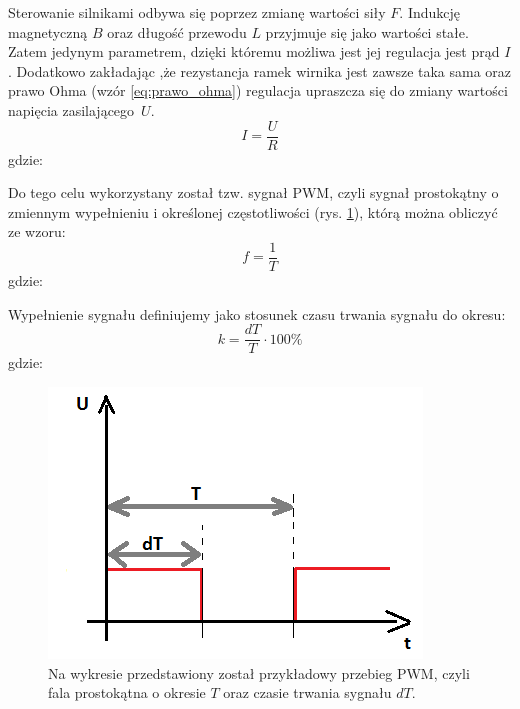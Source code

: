 Sterowanie silnikami odbywa się poprzez zmianę wartości siły $F$. Indukcję magnetyczną $B$ oraz długość przewodu $L$ przyjmuje się jako wartości stałe. Zatem jedynym parametrem, dzięki któremu możliwa jest jej regulacja jest prąd $I$. Dodatkowo zakładając ,że rezystancja ramek wirnika jest zawsze taka sama oraz prawo Ohma (wzór \ref{eq:prawo_ohma}) regulacja upraszcza się do zmiany wartości napięcia zasilającego~$U$. 
\begin{equation}
	I = \frac{U}{R}
   \label{eq:prawo_ohma}
 \end{equation}
 gdzie:  
 \begin{equationDescriptor}
 \end{equationDescriptor}
\noindent
Do tego celu wykorzystany został tzw. sygnał PWM, czyli sygnał prostokątny o zmiennym wypełnieniu i określonej częstotliwości (rys. \ref{sygnal_PWM}), którą można obliczyć ze wzoru:
\begin{equation}
	f =  \frac{1}{T}
   \label{eq:czestotliwosc}
 \end{equation}
 gdzie:  
 \begin{equationDescriptor}
 \end{equationDescriptor}
\noindent
 Wypełnienie sygnału definiujemy jako stosunek czasu trwania sygnału do okresu:
 \begin{equation}
	k =  \frac{dT}{T} \cdot 100\%
   \label{eq:wsp_wypelnienia}
 \end{equation}
 gdzie:  
 \begin{equationDescriptor}
 \end{equationDescriptor}
 \newpage
  \begin{figure}[H]
    \begin{center}
      \includegraphics[scale=0.65]{imgs/wykres.png}
 	\caption[Sygnał PWM.]{\small{Na wykresie przedstawiony został przykładowy przebieg PWM, czyli fala prostokątna o okresie $T$ oraz czasie trwania sygnału $dT$.}}
	\label{sygnal_PWM}
    \end{center}
  \end{figure}  
